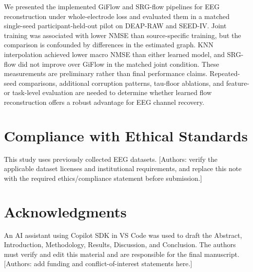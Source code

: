 \documentclass{article}
\begin{document}
We presented the implemented GiFlow and SRG-flow pipelines for EEG
reconstruction under whole-electrode loss and evaluated them in a matched
single-seed participant-held-out pilot on DEAP-RAW and SEED-IV. Joint
training was associated with lower NMSE than source-specific training,
but the comparison is confounded by differences in the estimated graph.
KNN interpolation achieved lower macro NMSE than either learned model,
and SRG-flow did not improve over GiFlow in the matched joint condition.
These measurements are preliminary rather than final performance claims.
Repeated-seed comparisons, additional corruption patterns, tau-floor
ablations, and feature- or task-level evaluation are needed to determine
whether learned flow reconstruction offers a robust advantage for EEG
channel recovery.

\section*{Compliance with Ethical Standards}
This study uses previously collected EEG datasets. [Authors: verify the
applicable dataset licenses and institutional requirements, and replace
this note with the required ethics/compliance statement before submission.]

\section*{Acknowledgments}
An AI assistant using Copilot SDK in VS Code was used to draft the Abstract,
Introduction, Methodology, Results, Discussion, and Conclusion. The authors
must verify and edit this material and are responsible for the final
manuscript. [Authors: add funding and conflict-of-interest statements here.]



\end{document}

